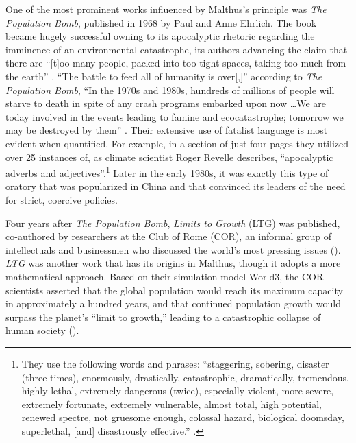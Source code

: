 One of the most prominent works influenced by Malthus’s principle was \emph{The Population Bomb}, published in 1968 by Paul and Anne Ehrlich. The book became hugely successful owning to its apocalyptic rhetoric regarding the imminence of an environmental catastrophe, its authors advancing the claim that there are “[t]oo many people, packed into too-tight spaces, taking too much from the earth” \autocite{Mann2018Smithsonian}. “The battle to feed all of humanity is over[,]” according to \emph{The Population Bomb}, “In the 1970s and 1980s, hundreds of millions of people will starve to death in spite of any crash programs embarked upon now …We are today involved in the events leading to famine and ecocatastrophe; tomorrow we may be destroyed by them” \autocite[p.\ xi]{Ehrlich1971PopulationBomb}. Their extensive use of fatalist language is most evident when quantified. For example, in a section of just four pages they utilized over 25 instances of, as climate scientist Roger Revelle describes, “apocalyptic adverbs and adjectives''.\footnote{They use the following words and phrases: ``staggering, sobering, disaster (three times), enormously, drastically, catastrophic, dramatically, tremendous, highly lethal, extremely dangerous (twice), especially violent, more severe, extremely fortunate, extremely vulnerable, almost total, high potential, renewed spectre, not gruesome enough, colossal hazard, biological doomsday, superlethal, [and] disastrously effective.'' \cite[pp.\ 66-70]{Revelle1971}.} Later in the early 1980s, it was exactly this type of oratory that was popularized in China and that convinced its leaders of the need for strict, coercive policies.

Four years after \emph{The Population Bomb}, \emph{Limits to Growth} (LTG) was published, co-authored by researchers at the Club of Rome (COR), an informal group of intellectuals and businessmen who discussed the world’s most pressing issues (\cites{Masini2001}{ClubOfRomeAbout}). \emph{LTG} was another work that has its origins in Malthus, though it adopts a more mathematical approach. Based on their simulation model World3, the COR scientists asserted that the global population would reach its maximum capacity in approximately a hundred years, and that continued population growth would surpass the planet’s “limit to growth,” leading to a catastrophic collapse of human society (\cites[p.\ 23]{MeadowsEtAl1976}[p.\ 132]{Greenhalgh2008JustOneChild}).

